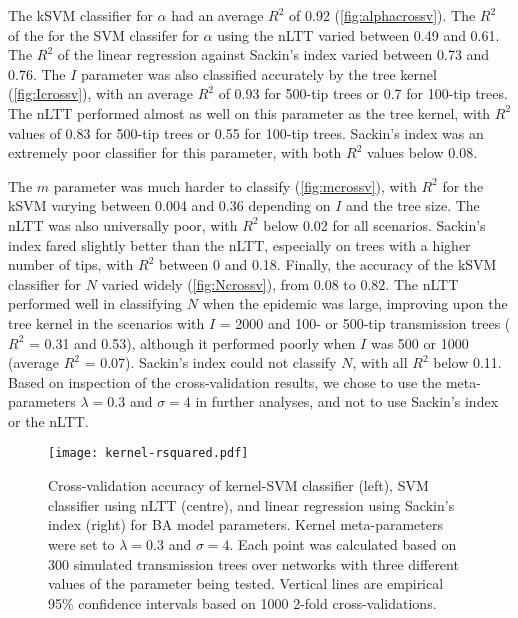 \documentclass[12pt]{article}\usepackage[]{graphicx}\usepackage[]{color}
\begin{document}
The kSVM classifier for $\alpha$ had an average $R^2$ of
    0.92 
(\cref{fig:alphacrossv}). The $R^2$ of the for the SVM classifer for $\alpha$
using the \gls{nLTT} varied between
0.49
and
  0.61.
The $R^2$ of the linear regression against Sackin's index varied between
  0.73
and
  0.76.
The $I$ parameter was also classified accurately by the tree kernel
(\cref{fig:Icrossv}), with an average
$R^2$ of 
  0.93 
for 500-tip trees or 
  0.7 
for 100-tip trees. The \gls{nLTT} performed almost as well on this parameter as
the tree kernel, with $R^2$ values of
  0.83
for 500-tip trees or
  0.55
for 100-tip trees. Sackin's index was an extremely poor classifier for this
parameter, with both $R^2$ values below
  0.08.

The $m$ parameter was much harder to classify (\cref{fig:mcrossv}), with $R^2$
for the kSVM varying between 
  0.004
and
  0.36
depending on $I$ and the tree size. The \gls{nLTT} was also universally poor,
with $R^2$ below
  0.02
for all scenarios. Sackin's index fared slightly better than the \gls{nLTT},
especially on trees with a higher number of tips, with $R^2$ between
  0
and
  0.18.
Finally, the accuracy of the kSVM classifier for $N$ varied widely
(\cref{fig:Ncrossv}), from 
  0.08
to
  0.82.
The \gls{nLTT} performed well in classifying $N$ when the epidemic was large,
improving upon the tree kernel in the scenarios with $I$ = 2000 and 100- or
500-tip transmission trees ($R^2$ = 
  0.31
and
  0.53),
although it performed poorly when $I$ was 500 or 1000 (average $R^2$ =
  0.07).
Sackin's index could not classify $N$, with all $R^2$ below
  0.11.
Based on inspection of the cross-validation results, we chose to use the
meta-parameters $\lambda = 0.3$ and $\sigma = 4$ in further analyses, and not
to use Sackin's index or the \gls{nLTT}. 

\begin{figure}[ht]
  \centering
  \texttt{[image: kernel-rsquared.pdf]}
  \caption{
      Cross-validation accuracy of kernel-SVM classifier (left), SVM classifier
      using \gls{nLTT} (centre), and linear regression using Sackin's index
      (right) for \gls{BA} model parameters. Kernel meta-parameters were set to
      $\lambda = 0.3$ and $\sigma = 4$. Each point was calculated based on 300
      simulated transmission trees over networks with three different values of
      the parameter being tested. Vertical lines are empirical 95\% confidence
      intervals based on 1000 2-fold cross-validations.
  }
  \label{fig:rsquared}
\end{figure}
\end{document}
